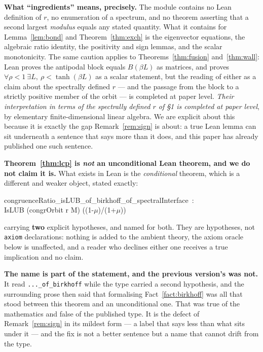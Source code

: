 \documentclass[11pt,a4paper]{article}
\theoremstyle{plain}
\theoremstyle{definition}
\begin{document}
\textbf{What ``ingredients'' means, precisely.} The module contains no Lean
definition of $r$, no enumeration of a spectrum, and no theorem asserting that a
second largest \emph{modulus} equals any stated quantity. What it contains for
Lemma~\ref{lem:bond} and Theorem~\ref{thm:exch} is the eigenvector equations,
the algebraic ratio identity, the positivity and sign lemmas, and the scalar
monotonicity. The same caution applies to Theorems~\ref{thm:fusion}
and~\ref{thm:wall}: Lean proves the antipodal block equals $B(\beta L)$ as
matrices, and proves $\forall\rho<1\ \exists L,\ \rho<\tanh(\beta L)$ as a
scalar statement, but the reading of either as a claim about the spectrally
defined $r$ --- and the passage from the block to a strictly positive member of
the orbit --- is completed at paper level. \emph{Their interpretation in terms of the spectrally defined $r$
of \S1 is completed at paper level}, by elementary finite-dimensional linear
algebra. We are explicit about this because it is exactly the gap
Remark~\ref{rem:sign} is about: a true Lean lemma can sit underneath a sentence
that says more than it does, and this paper has already published one such
sentence.

\textbf{Theorem~\ref{thm:lcp} is \emph{not} an unconditional Lean theorem, and we
do not claim it is.} What exists in Lean is the \emph{conditional} theorem, which
is a different and weaker object, stated exactly:
\begin{center}
\ttfamily\small
congruenceRatio\_isLUB\_of\_birkhoff\_of\_spectralInterface\ :\\
IsLUB (congrOrbit r M) ((1-$\mu$)/(1+$\mu$))
\end{center}
carrying \textbf{two} explicit hypotheses, and named for both. They are
hypotheses, not \texttt{axiom} declarations: nothing is added to the ambient
theory, the axiom oracle below is unaffected, and a reader who declines either
one receives a true implication and no claim.

\textbf{The name is part of the statement, and the previous version's was not.}
It read \verb|..._of_birkhoff| while the type carried a second hypothesis, and
the surrounding prose then said that formalising Fact~\ref{fact:birkhoff} was all
that stood between this theorem and an unconditional one. That was true of the
mathematics and false of the published type. It is the defect of
Remark~\ref{rem:sign} in its mildest form --- a label that says less than what
sits under it --- and the fix is not a better sentence but a name that cannot
drift from the type.
\end{document}
